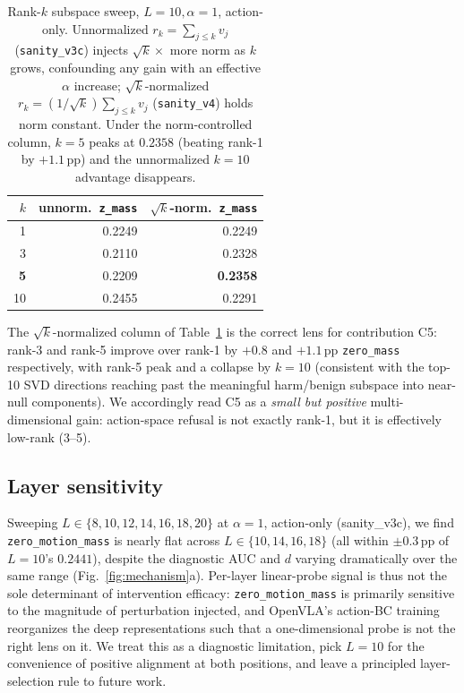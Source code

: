 \begin{table}[t]
\centering\small
\begin{tabular}{r r r}
\toprule
$k$ & unnorm.\ \texttt{z\_mass} & $\sqrt{k}$-norm.\ \texttt{z\_mass} \\
\midrule
1  & 0.2249 & 0.2249 \\
3  & 0.2110 & 0.2328 \\
\textbf{5}  & 0.2209 & \textbf{0.2358} \\
10 & 0.2455 & 0.2291 \\
\bottomrule
\end{tabular}
\caption{Rank-$k$ subspace sweep, $L{=}10, \alpha{=}1$, action-only. Unnormalized $r_k = \sum_{j \le k} v_j$ (\texttt{sanity\_v3c}) injects $\sqrt{k}\times$ more norm as $k$ grows, confounding any gain with an effective $\alpha$ increase; $\sqrt{k}$-normalized $r_k = (1/\sqrt{k})\sum_{j\le k} v_j$ (\texttt{sanity\_v4}) holds norm constant. Under the norm-controlled column, $k{=}5$ peaks at $0.2358$ (beating rank-1 by $+1.1$\,pp) and the unnormalized $k{=}10$ advantage disappears.}
\label{tab:rankk}
\end{table}

The $\sqrt{k}$-normalized column of Table~\ref{tab:rankk} is the correct lens for contribution C5: rank-3 and rank-5 improve over rank-1 by $+0.8$ and $+1.1$\,pp \texttt{zero\_mass} respectively, with rank-5 peak and a collapse by $k{=}10$ (consistent with the top-10 SVD directions reaching past the meaningful harm/benign subspace into near-null components). We accordingly read C5 as a \emph{small but positive} multi-dimensional gain: action-space refusal is not exactly rank-1, but it is effectively low-rank (3--5).

\subsection{Layer sensitivity}
\label{sec:exp:layer}

Sweeping $L \in \{8,10,12,14,16,18,20\}$ at $\alpha{=}1$, action-only (sanity\_v3c), we find \texttt{zero\_motion\_mass} is nearly flat across $L \in \{10, 14, 16, 18\}$ (all within $\pm 0.3$\,pp of $L{=}10$'s $0.2441$), despite the diagnostic AUC and $d$ varying dramatically over the same range (Fig.~\ref{fig:mechanism}a). Per-layer linear-probe signal is thus not the sole determinant of intervention efficacy: \texttt{zero\_motion\_mass} is primarily sensitive to the magnitude of perturbation injected, and OpenVLA's action-BC training reorganizes the deep representations such that a one-dimensional probe is not the right lens on it. We treat this as a diagnostic limitation, pick $L{=}10$ for the convenience of positive alignment at both positions, and leave a principled layer-selection rule to future work.

